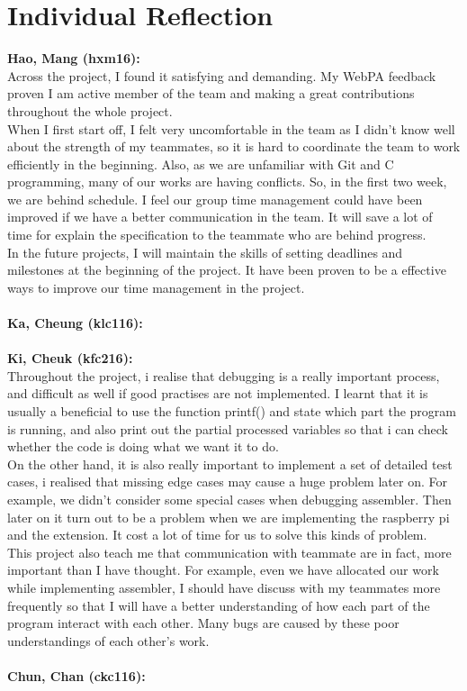 \documentclass[11pt]{article}
\begin{document}
\section{Individual Reflection}
\textbf{Hao, Mang (hxm16):}
\\ Across the project, I found it satisfying and demanding. My WebPA feedback proven I am active member of the team and making a great contributions throughout the whole project.
\\When I first start off, I felt very uncomfortable in the team  as I didn’t know well about the strength of my teammates, so it is hard to coordinate the team to work efficiently in the beginning. Also, as we are unfamiliar with Git and C programming, many of our works are having conflicts. So, in the first two week, we are behind schedule. I feel our group time management could have been improved if we have a better communication in the team. It will save a lot of time for explain the specification to the teammate who are behind progress.
\\In the future projects, I will maintain the skills of setting deadlines and milestones at the beginning of the project. It have been proven to be a effective ways to improve our time management in the project.
\\
\\
\textbf{Ka, Cheung (klc116):}
\\
\\
\textbf{Ki, Cheuk (kfc216):}
\\Throughout the project, i realise that debugging is a really important process, and difficult as well if good practises are not implemented. I learnt that it is usually a beneficial  to use the function printf() and state which part the program is running, and also print out the partial processed variables so that i can check whether the code is doing what we want it to do.
\\On the other hand, it is also really important to implement a set of detailed test cases, i realised that missing edge cases may cause a huge problem later on. For example, we didn’t consider some special cases when debugging assembler. Then later on it turn out to be a problem when we are implementing the raspberry pi and the extension. It cost a lot of time for us to solve this kinds of problem. 
\\This project also teach me that communication with teammate are in fact, more important than I have thought. For example, even we have allocated our work while implementing assembler, I should have discuss with my teammates more frequently so that I will have a better understanding of how each part of the program interact with each other. Many bugs are caused by these poor understandings of each other's work.
\\
\\
\textbf{Chun, Chan (ckc116):}
\end{document}
